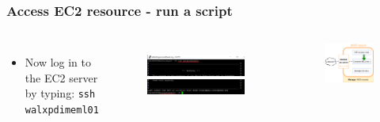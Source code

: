 \documentclass[aspectratio=169]{beamer} %
\newcommand{\ectwoName}{walxpdimeml01}
\begin{document}
\begin{frame}
	\frametitle{Access EC2 resource - run a script}
	\begin{columns}[c]
		\begin{itemize}
			\item Now log in to the EC2 server by typing: \newline
			\texttt{ssh \ectwoName}
		\end{itemize}

		\begin{figure}
			\centering
			\includegraphics[width=\textwidth]{./img/access-3a.png}
			\includegraphics[width=\textwidth]{./img/access-3b.png}
		\end{figure}

		\begin{figure}
			\centering
			\includegraphics[width=\textwidth]{./img/wb-aws-ec2.png}
		\end{figure}

	\end{columns}
\end{frame}
\end{document}

